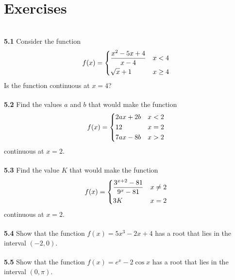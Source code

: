 \documentclass[11pt]{scrartcl}
\begin{document}
\section{Exercises}\\
\noindent
\textbf{5.1} Consider the function  
\[
   f(x)= \begin{dcases}
        \frac{x^2-5x+4}{x-4} & x<4 \\
        \sqrt x +1 & x \geq 4
       
    \end{dcases}
\]
Is the function continuous at $x=4$?\\
\noindent\\
\textbf{5.2} Find the values $a$ and $b$ that would make the function
\[
   f(x)= \begin{dcases}
        2ax+2b & x<2 \\
        12 & x = 2\\
        7ax-8b & x>2
       
    \end{dcases}
\]
continuous at $x=2$.\\
\noindent\\
\textbf{5.3} Find the value $K$ that would make the function 
\[
   f(x)= \begin{dcases}
        \frac{3^{x+2}-81}{9^x-81} & x\neq 2 \\
        3K & x = 2\\
    \end{dcases}
\]
continuous at $x=2$.\\
\noindent\\
\textbf{5.4} Show that the function $f(x)=5x^3-2x+4$ has a root that lies in the interval $(-2,0)$. \\
\noindent\\
\textbf{5.5} Show that the function $f(x)=e^x-2\cos x$ has a root that lies in the interval $(0, \pi)$. 
\end{document}
